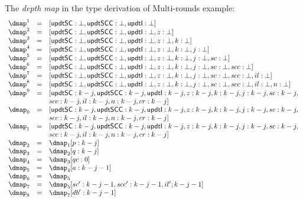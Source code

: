 The \emph{depth map} in the type derivation of Multi-rounds example:
\[
\begin{array}{lll}
\dmap^1     & = & [\mathsf{updtSC}: \bot, \mathsf{updtSCC}: \bot, \mathsf{updtI}: \bot] \\
\dmap^2     & = & [\mathsf{updtSC}: \bot, \mathsf{updtSCC}: \bot, \mathsf{updtI}: \bot, z: \bot] \\
\dmap^3     & = & [\mathsf{updtSC}: \bot, \mathsf{updtSCC}: \bot, \mathsf{updtI}: \bot, z: \bot, k : \bot] \\
\dmap^4     & = & [\mathsf{updtSC}: \bot, \mathsf{updtSCC}: \bot, \mathsf{updtI}: \bot, z: \bot, k : \bot, j : \bot]  \\
\dmap^5     & = & [\mathsf{updtSC}: \bot, \mathsf{updtSCC}: \bot, \mathsf{updtI}: \bot, z: \bot, k : \bot, j : \bot, sc: \bot] \\
\dmap^6     & = & [\mathsf{updtSC}: \bot, \mathsf{updtSCC}: \bot, \mathsf{updtI}: \bot, z: \bot, k : \bot, j : \bot, sc: \bot, scc: \bot] \\
\dmap^7     & = & [\mathsf{updtSC}: \bot, \mathsf{updtSCC}: \bot, \mathsf{updtI}: \bot, z: \bot, k : \bot, j : \bot, sc: \bot, scc: \bot, il : \bot] \\
\dmap^8     & = & [\mathsf{updtSC}: \bot, \mathsf{updtSCC}: \bot, \mathsf{updtI}: \bot, z: \bot, k : \bot, j : \bot, sc: \bot, scc: \bot, il : \bot, n : \bot] \\
\dmap^9     & = & [\mathsf{updtSC}: k - j, \mathsf{updtSCC}: k - j, 
                   \mathsf{updtI}: k - j, z: k - j, k : k - j, 
                   j : k - j, sc: k - j,\\
            &   & scc: k - j, il : k - j, n : k - j, cr: k - j] \\
%
\dmap_0   & = & [\mathsf{updtSC}: k - j, \mathsf{updtSCC}: k - j, 
                   \mathsf{updtI}: k - j, z: k - j, k : k - j, 
                   j : k - j, sc: k - j,\\
            &   & scc: k - j, il : k - j, n : k - j, cr: k - j] \\
%
\dmap_1   & = & [\mathsf{updtSC}: k - j, \mathsf{updtSCC}: k - j, 
                   \mathsf{updtI}: k - j, z: k - j, k : k - j, 
                   j : k - j, sc: k - j,\\
            &   & scc: k - j, il : k - j, n : k - j, cr: k - j] \\
%
\dmap_2   & = & \dmap_1[p : k - j]\\
\dmap_3   & = & \dmap_2[q : k - j]\\
\dmap_4   & = & \dmap_3[qc : 0]\\
\dmap_5   & = & \dmap_4[a : k - j - 1]\\
\dmap_6   & = & \dmap_5\\
\dmap_7   & = & \dmap_5[sc' : k - j - 1, scc' : k - j - 1, il' ; k - j - 1]\\
\dmap_8   & = & \dmap_7[db' : k - j - 1]\\
\end{array}
\]

